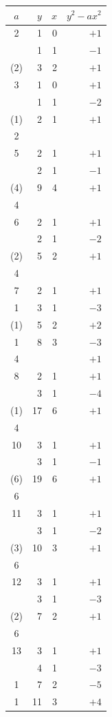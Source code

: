 \documentclass[11pt]{article}
\begin{document}
\begin{center}
\renewcommand{\arraystretch}{1.05}
\begin{tabular}{|c|r|r|r|}
\hline
$a$ & $y$ & $x$ & $y^2 - ax^2$ \\
\hline
2 & 1 & 0 & $+1$ \\
 & 1 & 1 & $-1$ \\
(2) & 3 & 2 & $+1$ \\
\hline
3 & 1 & 0 & $+1$ \\
 & 1 & 1 & $-2$ \\
(1) & 2 & 1 & $+1$ \\
2 & & & \\
\hline
5 & 2 & 1 & $+1$ \\
 & 2 & 1 & $-1$ \\
(4) & 9 & 4 & $+1$ \\
4 & & & \\
\hline
6 & 2 & 1 & $+1$ \\
 & 2 & 1 & $-2$ \\
(2) & 5 & 2 & $+1$ \\
4 & & & \\
\hline
7 & 2 & 1 & $+1$ \\
1 & 3 & 1 & $-3$ \\
(1) & 5 & 2 & $+2$ \\
1 & 8 & 3 & $-3$ \\
4 & & & $+1$ \\
\hline
8 & 2 & 1 & $+1$ \\
 & 3 & 1 & $-4$ \\
(1) & 17 & 6 & $+1$ \\
4 & & & \\
\hline
10 & 3 & 1 & $+1$ \\
 & 3 & 1 & $-1$ \\
(6) & 19 & 6 & $+1$ \\
6 & & & \\
\hline
11 & 3 & 1 & $+1$ \\
 & 3 & 1 & $-2$ \\
(3) & 10 & 3 & $+1$ \\
6 & & & \\
\hline
12 & 3 & 1 & $+1$ \\
 & 3 & 1 & $-3$ \\
(2) & 7 & 2 & $+1$ \\
6 & & & \\
\hline
13 & 3 & 1 & $+1$ \\
 & 4 & 1 & $-3$ \\
1 & 7 & 2 & $-5$ \\
1 & 11 & 3 & $+4$ \\

\end{tabular}
\end{center}
\end{document}
